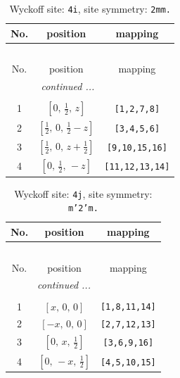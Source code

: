 \documentclass[fleqn,8pt]{jsarticle}
\begin{document}
\renewcommand{\arraystretch}{1.2}
\begin{longtable}{ccc}
\caption{Wyckoff site: {\tt 4i}, site symmetry: {\tt 2mm.}}
 \\
 \hline \hline
No. & position & mapping \\ \hline \endfirsthead

\multicolumn{2}{l}{\tablename\ \thetable{}} \\
 \hline \hline
No. & position & mapping \\ \hline \endhead

 \hline \hline
\multicolumn{2}{r}{\footnotesize\it continued ...} \\ \endfoot

 \hline \hline
\multicolumn{2}{r}{} \\ \endlastfoot

1 & $\left[ 0,\, \frac{1}{2},\, z \right]$ & {\tt [1,2,7,8]} \\ \hline
2 & $\left[ \frac{1}{2},\, 0,\, \frac{1}{2} - z \right]$ & {\tt [3,4,5,6]} \\ \hline
3 & $\left[ \frac{1}{2},\, 0,\, z + \frac{1}{2} \right]$ & {\tt [9,10,15,16]} \\ \hline
4 & $\left[ 0,\, \frac{1}{2},\, - z \right]$ & {\tt [11,12,13,14]} \\
\end{longtable}
\renewcommand{\arraystretch}{1.2}
\begin{longtable}{ccc}
\caption{Wyckoff site: {\tt 4j}, site symmetry: {\tt m'2'm.}}
 \\
 \hline \hline
No. & position & mapping \\ \hline \endfirsthead

\multicolumn{2}{l}{\tablename\ \thetable{}} \\
 \hline \hline
No. & position & mapping \\ \hline \endhead

 \hline \hline
\multicolumn{2}{r}{\footnotesize\it continued ...} \\ \endfoot

 \hline \hline
\multicolumn{2}{r}{} \\ \endlastfoot

1 & $\left[ x,\, 0,\, 0 \right]$ & {\tt [1,8,11,14]} \\ \hline
2 & $\left[ - x,\, 0,\, 0 \right]$ & {\tt [2,7,12,13]} \\ \hline
3 & $\left[ 0,\, x,\, \frac{1}{2} \right]$ & {\tt [3,6,9,16]} \\ \hline
4 & $\left[ 0,\, - x,\, \frac{1}{2} \right]$ & {\tt [4,5,10,15]} \\
\end{longtable}
\end{document}
